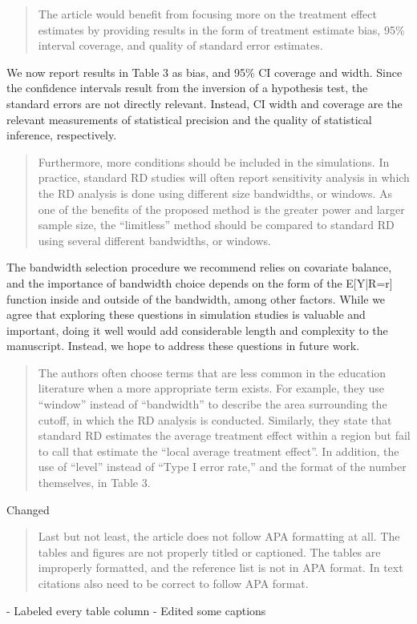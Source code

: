 \documentclass[12pt]{article}
\begin{document}
\begin{quote}
The article would benefit from focusing more on the treatment effect
estimates by providing results in the form of treatment estimate bias,
95\% interval coverage, and quality of standard error estimates.
\end{quote}
We now report results in Table 3 as bias, and 95\% CI coverage and
width. Since the confidence intervals result from the inversion of a
hypothesis test, the standard errors are not directly
relevant. Instead, CI width and coverage are the relevant measurements
of statistical precision and the quality of statistical inference,
respectively.

\begin{quote}
Furthermore, more conditions should be included in the simulations. In
practice, standard RD studies will often report sensitivity analysis
in which the RD analysis is done using different size bandwidths, or
windows. As one of the benefits of the proposed method is the greater
power and larger sample size, the “limitless” method should be
compared to standard RD using several different bandwidths, or
windows.
\end{quote}

The bandwidth selection procedure we recommend relies on covariate
balance, and the importance of bandwidth choice depends on the form of
the E[Y|R=r] function inside and outside of the bandwidth, among other
factors.
While we agree that exploring these questions in simulation studies is
valuable and important, doing it well would add considerable length
and complexity to the manuscript.
Instead, we hope to address these questions in future work.

\begin{quote}
The authors often choose terms that are less common in the education
literature when a more appropriate term exists. For example, they use
“window” instead of “bandwidth” to describe the area surrounding the
cutoff, in which the RD analysis is conducted. Similarly, they state
that standard RD estimates the average treatment effect within a
region but fail to call that estimate the “local average treatment
effect”. In addition, the use of “level” instead of “Type I error
rate,” and the format of the number themselves, in Table 3.
\end{quote}
Changed

\begin{quote}
Last but not least, the article does not follow APA formatting at
all. The tables and figures are not properly titled or captioned. The
tables are improperly formatted, and the reference list is not in APA
format. In text citations also need to be correct to follow APA
format.
\end{quote}
- Labeled every table column
- Edited some captions
\end{document}
